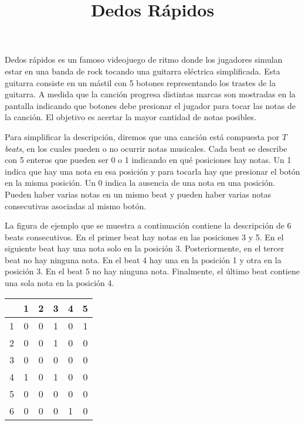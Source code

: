 \documentclass{oci}
\title{Dedos Rápidos}
\begin{document}
\begin{problemDescription}
  Dedos rápidos es un famoso videojuego de ritmo donde los jugadores simulan
  estar en una banda de rock tocando una guitarra eléctrica simplificada.
  Esta guitarra consiste en un mástil con 5 botones representando los trastes de
  la guitarra.
  A medida que la canción progresa distintas marcas son mostradas en la pantalla
  indicando que botones debe presionar el jugador para tocar las notas de la canción.
  El objetivo es acertar la mayor cantidad de notas posibles.

  Para simplificar la descripción, diremos que una canción está compuesta por $T$
  \emph{beats}, en los cuales pueden o no ocurrir notas musicales.
  Cada beat se describe con 5 enteros que pueden ser 0 o 1 indicando en qué
  posiciones hay notas.
  Un 1 indica que hay una nota en esa posición y para tocarla hay que presionar
  el botón en la misma posición.
  Un 0 indica la ausencia de una nota en una posición.
  Pueden haber varias notas en un mismo beat y pueden haber varias
  notas consecutivas asociadas al mismo botón.

  La figura de ejemplo que se muestra a continuación contiene la descripción de
  6 beats consecutivos.
  En el primer beat hay notas en las posiciones 3 y 5.
  En el siguiente beat hay una nota solo en la posición 3.
  Posteriormente, en el tercer beat no hay ninguna nota.
  En el beat 4 hay una en la posición 1 y otra en la posición 3.
  En el beat 5 no hay ninguna nota.
  Finalmente, el último beat contiene una sola nota en la posición 4.

  \begin{center}
    \begin{tabular}{r|ccccc}
        & 1 & 2 & 3 & 4 & 5 \\
      \hline
      1 & 0 & 0 & 1 & 0 & 1 \\
      2 & 0 & 0 & 1 & 0 & 0 \\
      3 & 0 & 0 & 0 & 0 & 0 \\
      4 & 1 & 0 & 1 & 0 & 0 \\
      5 & 0 & 0 & 0 & 0 & 0 \\
      6 & 0 & 0 & 0 & 1 & 0 \\
    \end{tabular}
  \end{center}


\end{problemDescription}
\end{document}
